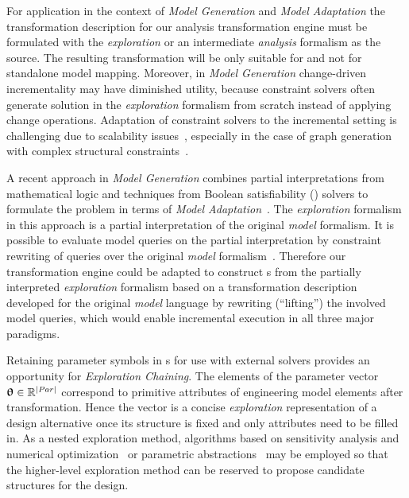 For application in the context of \emph{Model Generation} and \emph{Model Adaptation} the transformation description for our analysis transformation engine must be formulated with the \emph{exploration} or an intermediate \emph{analysis} formalism as the source. The resulting transformation will be only suitable for  and not for standalone model mapping. Moreover, in \emph{Model Generation} change-driven incrementality may have diminished utility, because constraint solvers often generate solution in the \emph{exploration} formalism from scratch instead of applying change operations. Adaptation of constraint solvers to the incremental setting is challenging due to scalability issues~\citep{Semerath16generation}, especially in the case of graph generation with complex structural constraints~\citep{Semerath16backward}.

\begin{remark}
  A recent approach in \emph{Model Generation} combines partial interpretations from mathematical logic and techniques from Boolean satisfiability () solvers to formulate the problem in terms of \emph{Model Adaptation}~\citep{Varro17generation}. The \emph{exploration} formalism in this approach is a partial interpretation of the original \emph{model} formalism. It is possible to evaluate model queries on the partial interpretation by constraint rewriting of queries over the original \emph{model} formalism~\citep{Semerath17rewriting}. Therefore our transformation engine could be adapted to construct s from the partially interpreted \emph{exploration} formalism based on a transformation description developed for the original \emph{model} language by rewriting (\enquote{lifting}) the involved model queries, which would enable incremental execution in all three major  paradigms.
\end{remark}

\begin{remark}
  Retaining parameter symbols in s for use with external solvers provides an opportunity for \emph{Exploration Chaining}. The elements of the  parameter vector \(\bm{\mathrm{\uptheta}} \in \mathbb{R}^{\lvert \textrm{\itshape Par\/} \rvert}\) correspond to primitive attributes of engineering model elements after transformation. Hence the vector is a concise \emph{exploration} representation of a design alternative once its structure is fixed and only attributes need to be filled in. As a nested exploration method, algorithms based on sensitivity analysis and numerical optimization~\citep{Molnar17optimization} or parametric abstractions~\citep{Quatmann16mdp} may be employed so that the higher-level exploration method can be reserved to propose candidate structures for the design. 
\end{remark}

